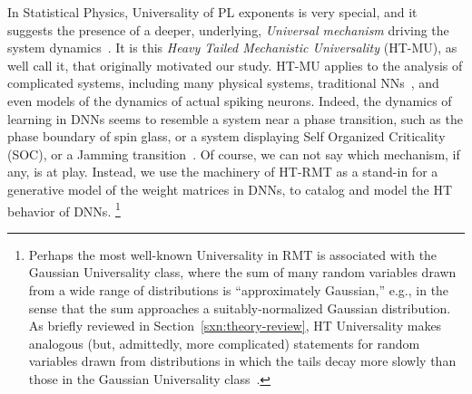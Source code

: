 In Statistical Physics, Universality of PL exponents is very special, and it suggests the presence of a deeper, underlying, \emph{Universal mechanism} driving the system dynamics~\cite{SornetteBook,BouchaudPotters03}.
It is this \emph{Heavy Tailed Mechanistic Universality} (HT-MU), as well call it, that originally motivated our study.  
HT-MU applies to the analysis of complicated systems, including many physical systems, traditional NNs~\cite{EB01_BOOK,nishimori01}, and even models of the dynamics of actual spiking neurons.
Indeed, the dynamics of learning in DNNs 
seems to resemble a system near a phase transition, such as the phase boundary of spin glass, or a system displaying Self Organized Criticality (SOC), or a Jamming transition~\cite{GSdx18_TR,SGd18_TR}. 
Of course, we can not say which mechanism, if any, is at play. 
Instead, we use the machinery of  HT-RMT as a stand-in for a generative model of the weight matrices in DNNs, to catalog and model the HT behavior of DNNs.%
\footnote{Perhaps the most well-known Universality in RMT is associated with the Gaussian Universality class, where the sum of many random variables drawn from a wide range of distributions is ``approximately Gaussian,'' e.g., in the sense that the sum approaches a suitably-normalized Gaussian distribution.  As briefly reviewed in Section~\ref{sxn:theory-review}, HT Universality makes analogous (but, admittedly, more complicated) statements for random variables drawn from distributions in which the tails decay more slowly than those in the Gaussian Universality class~\cite{MM18_TR}.}
